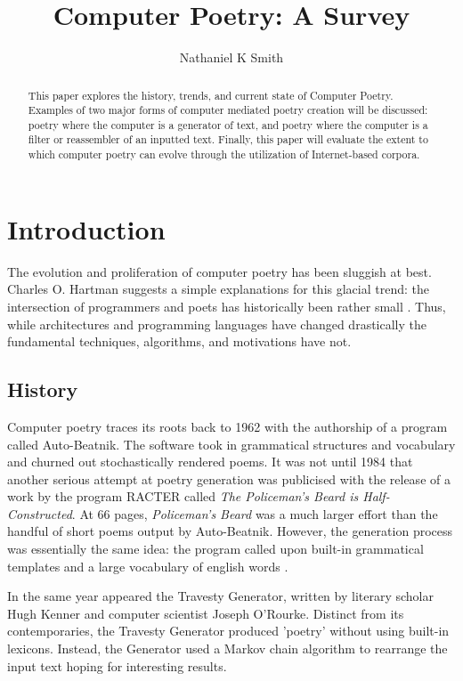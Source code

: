 \documentclass[10pt]{article}
\title{Computer Poetry: A Survey}
\author{Nathaniel K Smith}
\begin{document}
\maketitle

\begin{abstract}
This paper explores the history, trends, and current state of Computer Poetry.
Examples of two major forms of computer mediated poetry creation will be
discussed: poetry where the computer is a generator of text, and poetry where
the computer is a filter or reassembler of an inputted text. Finally, this
paper will evaluate the extent to which computer poetry can evolve through the
utilization of Internet-based corpora.
\end{abstract}

\doublespacing

\section{Introduction} 
The evolution and proliferation of computer poetry has been sluggish at best.
Charles O. Hartman suggests a simple explanations for this glacial trend: the
intersection of programmers and poets has historically been rather small
\cite{Hart96}. Thus, while architectures and programming languages have changed
drastically the fundamental techniques, algorithms, and motivations have not.

\subsection{History} 
Computer poetry traces its roots back to 1962 with the authorship of a program
called Auto-Beatnik. The software took in grammatical structures and vocabulary
and churned out stochastically rendered poems. It was not until 1984 that
another serious attempt at poetry generation was publicised with the release of
a work by the program RACTER called \emph{The Policeman's Beard is Half-
Constructed}. At 66 pages, \emph{Policeman's Beard} was a much larger effort
than the handful of short poems output by Auto-Beatnik. However, the generation
process was essentially the same idea: the program called upon built-in grammatical
templates and a large vocabulary of english words \cite{Chamb84}. 

In the same year appeared the Travesty Generator, written by literary scholar
Hugh Kenner and computer scientist Joseph O'Rourke. Distinct from its
contemporaries, the Travesty Generator produced 'poetry' without using built-in
lexicons. Instead, the Generator used a Markov chain algorithm to rearrange the input text hoping for interesting results.
\end{document}
